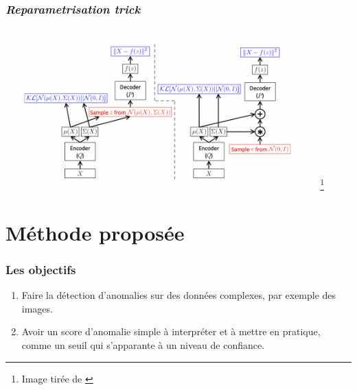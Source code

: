 \documentclass{beamer}
\newcommand\blfootnote[1]{%
	\begingroup
	\renewcommand\thefootnote{}\footnote{#1}%
	\addtocounter{footnote}{-1}%
	\endgroup
}
\begin{document}
	\begin{frame}
		\frametitle{\textit{Reparametrisation trick}}
		\centering
		\includegraphics[width=12cm]{images/vae-reparametrisation-trick}
		\blfootnote{Image tirée de \cite{doersch2016tutorial}}
	\end{frame}
	
	\section{Méthode proposée}
	
	\begin{frame}
		\frametitle{Les objectifs}
		\begin{enumerate}
			\item Faire la détection d'anomalies sur des données complexes, par exemple des images.
			\item Avoir un score d'anomalie simple à interpréter et à mettre en pratique, comme un seuil qui s'apparante à un niveau de confiance. 
		\end{enumerate}
	\end{frame}
	
\end{document}
